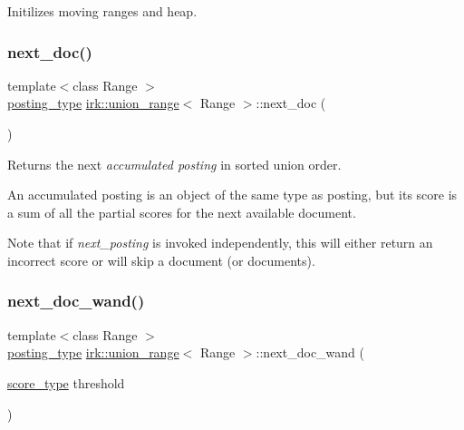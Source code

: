 Initilizes moving ranges and heap. 

\mbox{\label{classirk_1_1union__range_a8c5c42595554997abba7ce81c4e8251a}} 
\subsubsection{\texorpdfstring{next\+\_\+doc()}{next\_doc()}}
{\footnotesize\ttfamily template$<$class Range $>$ \\
\mbox{\hyperlink{classirk_1_1union__range_ac125c83e17d473ee5480fef76cfe42f9}{posting\+\_\+type}} \mbox{\hyperlink{classirk_1_1union__range}{irk\+::union\+\_\+range}}$<$ Range $>$\+::next\+\_\+doc (\begin{DoxyParamCaption}{ }\end{DoxyParamCaption})\hspace{0.3cm}{\ttfamily [inline]}}



Returns the next {\itshape accumulated posting} in sorted union order. 

An accumulated posting is an object of the same type as posting, but its score is a sum of all the partial scores for the next available document.

Note that if {\itshape next\+\_\+posting} is invoked independently, this will either return an incorrect score or will skip a document (or documents). \mbox{\label{classirk_1_1union__range_a230fb4a5ca924c3d7407baec393c53b7}} 
\subsubsection{\texorpdfstring{next\+\_\+doc\+\_\+wand()}{next\_doc\_wand()}}
{\footnotesize\ttfamily template$<$class Range $>$ \\
\mbox{\hyperlink{classirk_1_1union__range_ac125c83e17d473ee5480fef76cfe42f9}{posting\+\_\+type}} \mbox{\hyperlink{classirk_1_1union__range}{irk\+::union\+\_\+range}}$<$ Range $>$\+::next\+\_\+doc\+\_\+wand (\begin{DoxyParamCaption}\item[{\mbox{\hyperlink{classirk_1_1union__range_af728218b976df464ebb051a9e5358e93}{score\+\_\+type}}}]{threshold }\end{DoxyParamCaption})\hspace{0.3cm}{\ttfamily [inline]}}

